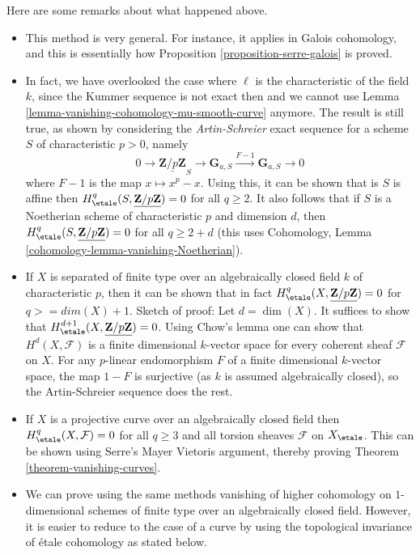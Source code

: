\begin{remarks}
\label{remarks-on-above}
Here are some remarks about what happened above.
\begin{itemize}
\item This method is very general. For instance, it applies in Galois
cohomology, and this is essentially how
Proposition \ref{proposition-serre-galois} is proved.
\item In fact, we have overlooked the case where $\ell$ is the characteristic
of the field $k$, since the Kummer sequence is not exact then and we cannot
use Lemma \ref{lemma-vanishing-cohomology-mu-smooth-curve} anymore.
The result is still true, as shown by considering the
{\it Artin-Schreier} exact sequence for a scheme $S$ of characteristic
$p >0$, namely
$$
0 \longrightarrow \underline{\mathbf{Z}/p\mathbf{Z}}_S \longrightarrow
\mathbf{G}_{a, S} \xrightarrow{F-1} \mathbf{G}_{a, S} \longrightarrow 0
$$
where $F - 1$ is the map $x \mapsto x^p - x$. Using this, it can be
shown that is $S$ is affine then
$H_\etale^q(S, \underline{\mathbf{Z}/p\mathbf{Z}}) = 0$ for all
$q \geq 2$. It also follows that if $S$ is a Noetherian scheme of
characteristic $p$ and dimension $d$, then
$H_\etale^q(S, \underline{\mathbf{Z}/p\mathbf{Z}}) = 0$
for all $q \geq 2 + d$
(this uses Cohomology, Lemma \ref{cohomology-lemma-vanishing-Noetherian}).
\item If $X$ is separated of finite type over an algebraically closed
field $k$ of characteristic $p$, then it can be shown that in fact
$H_\etale^q(X, \underline{\mathbf{Z}/p\mathbf{Z}}) = 0$ for
$q >= dim(X) + 1$.
Sketch of proof: Let $d = \dim(X)$. It suffices to show that
$H_\etale^{d + 1}(X, \underline{\mathbf{Z}/p\mathbf{Z}}) = 0$.
Using Chow's lemma one can show that $H^d(X, \mathcal{F})$
is a finite dimensional $k$-vector space for every coherent sheaf
$\mathcal{F}$ on $X$. For any $p$-linear endomorphism $F$ of
a finite dimensional $k$-vector space, the map $1 - F$ is surjective (as
$k$ is assumed algebraically closed),
so the Artin-Schreier sequence does the rest.
\item If $X$ is a projective curve over an algebraically closed field then
$H_\etale^q(X, \mathcal{F}) = 0$ for all $q \geq 3$ and all torsion
sheaves $\mathcal{F}$ on $X_\etale$. This can be shown using
Serre's Mayer Vietoris
argument, thereby proving Theorem \ref{theorem-vanishing-curves}.
\item We can prove using the same methods vanishing of higher cohomology
on $1$-dimensional schemes of finite type over an algebraically closed field.
However, it is easier to reduce to the case of a curve by using the
topological invariance of \'etale cohomology as stated below.
\end{itemize}
\end{remarks}

